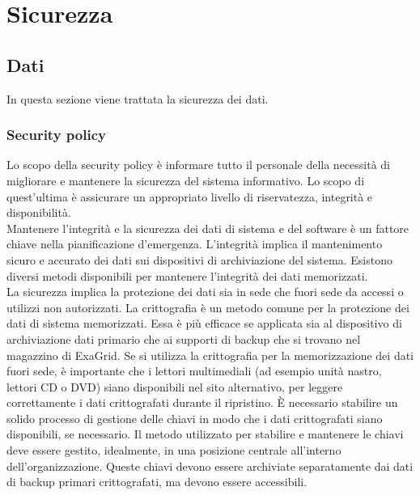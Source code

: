 \documentclass[12pt, a4paper, titlepage]{report}
\newcommand{\backupVendor}{ExaGrid} %
\begin{document}
	\newpage
	
	\section{Sicurezza}
		\subsection{Dati} \label{dati}
			In questa sezione viene trattata la sicurezza dei dati.
			\subsubsection{Security policy}
			Lo scopo della security policy è informare tutto il personale della necessità di migliorare e mantenere la sicurezza del sistema informativo. Lo scopo di quest'ultima è assicurare un appropriato livello di riservatezza, integrità e disponibilità.\\
			Mantenere l'integrità e la sicurezza dei dati di sistema e del software è un fattore chiave nella pianificazione d'emergenza. L'integrità implica il mantenimento sicuro e accurato dei dati sui dispositivi di archiviazione del sistema. Esistono diversi metodi disponibili per mantenere l'integrità dei dati memorizzati. \\
			La sicurezza implica la protezione dei dati sia in sede che fuori sede da accessi o utilizzi non autorizzati. La crittografia è un metodo comune per la protezione dei dati di sistema memorizzati. Essa è più efficace se applicata sia al dispositivo di archiviazione dati primario che ai supporti di backup che si trovano nel magazzino di \backupVendor. Se si utilizza la crittografia per la memorizzazione dei dati fuori sede, è importante che i lettori multimediali (ad esempio unità nastro, lettori CD o DVD) siano disponibili nel sito alternativo, per leggere correttamente i dati crittografati durante il ripristino.
			È necessario stabilire un solido processo di gestione delle chiavi in modo che i dati crittografati siano disponibili, se necessario. Il metodo utilizzato per stabilire e mantenere le chiavi deve essere gestito, idealmente, in una posizione centrale all'interno dell'organizzazione. Queste chiavi devono essere archiviate separatamente dai dati di backup primari crittografati, ma devono essere accessibili.
		
\end{document}
